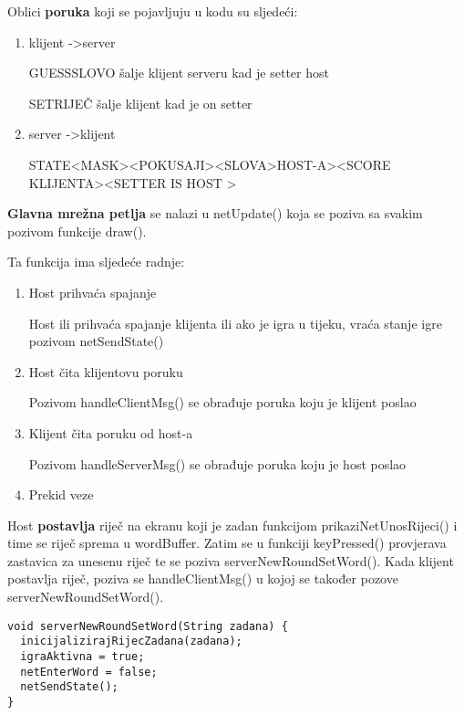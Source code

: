 \documentclass{article}
\begin{document}
Oblici \textbf{poruka} koji se pojavljuju u kodu su sljedeći: 
\begin{enumerate}[label=(\arabic*)] 
  \item klijent -\textgreater server

  GUESS\textbar SLOVO šalje klijent serveru kad je setter host

  SET\textbar RIJEČ šalje klijent kad je on setter

  \item server -\textgreater klijent

  STATE\textbar\textless MASK\textgreater\textbar\textless POKUSAJI\textgreater\textbar\textless SLOVA\textgreater\textbar\textlessSCORE HOST-A\textgreater\textbar\textless SCORE KLIJENTA\textgreater\textbar\textless SETTER IS HOST \textgreater




\end{enumerate}

\textbf{Glavna mrežna petlja} se nalazi u netUpdate() koja se poziva sa svakim pozivom funkcije draw().

Ta funkcija ima sljedeće radnje:
\begin{enumerate}[label=(\arabic*)] 
  \item Host prihvaća spajanje
  
  Host ili prihvaća spajanje klijenta ili ako je igra u tijeku, vraća stanje igre pozivom netSendState()
  \item Host čita klijentovu poruku

  Pozivom handleClientMsg() se obrađuje poruka koju je klijent poslao
  \item Klijent čita poruku od host-a

  Pozivom handleServerMsg() se obrađuje poruka koju je host poslao
  \item Prekid veze 
  
\end{enumerate}

Host \textbf{postavlja} riječ na ekranu koji je zadan funkcijom prikaziNetUnosRijeci() i time se riječ sprema u wordBuffer. Zatim se u funkciji keyPressed() provjerava zastavica za unesenu riječ te se poziva serverNewRoundSetWord(). Kada klijent postavlja riječ, poziva se handleClientMsg() u kojoj se također pozove serverNewRoundSetWord().

\begin{verbatim}
void serverNewRoundSetWord(String zadana) {
  inicijalizirajRijecZadana(zadana);
  igraAktivna = true;
  netEnterWord = false;
  netSendState();
}
\end{verbatim}
\end{document}
